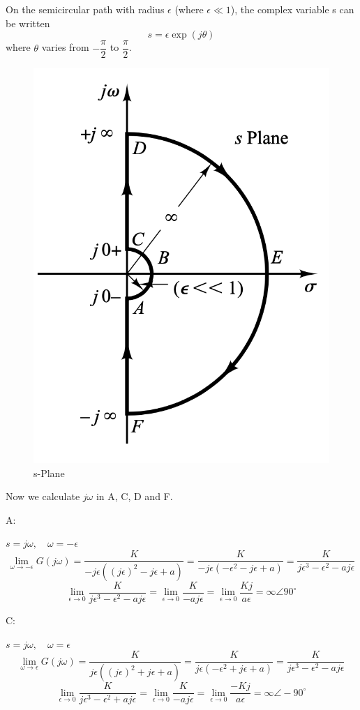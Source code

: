 On the semicircular path with radius $\epsilon$ (where $\epsilon \ll 1 $), the complex variable s can be written
$$
s = \epsilon \exp(j\theta)
$$
where $\theta$ varies from $-\dfrac{\pi}{2}$ to $\dfrac{\pi}{2}$.
\begin{figure}[H]
	\caption{s-Plane}
	\centering
	\includegraphics[width=12cm]{../Figure/Q2/nyquist_s_plane_name.png}
\end{figure}
Now we calculate $j\omega$ in A, C, D and F.

A:

$s = j\omega,\quad \omega = -\epsilon$
$$
 \lim_{\omega\to -\epsilon}G(j\omega)  = \dfrac{K}{-j\epsilon((j\epsilon)^2 - j\epsilon + a)} = \dfrac{K}{-j\epsilon(-\epsilon^2 - j\epsilon + a)} = \dfrac{K}{j\epsilon^3 - \epsilon^2 - aj\epsilon}
$$
$$
\lim_{\epsilon \to 0}\dfrac{K}{j\epsilon^3 - \epsilon^2 - aj\epsilon} = \lim_{\epsilon \to 0} \dfrac{K}{-aj\epsilon} = \lim_{\epsilon \to 0} \dfrac{Kj}{a\epsilon} =  \infty \angle 90^{\circ}
$$

C:

$s = j\omega,\quad \omega = \epsilon$
$$
 \lim_{\omega\to \epsilon}G(j\omega)  = \dfrac{K}{j\epsilon((j\epsilon)^2 + j\epsilon + a)} = \dfrac{K}{j\epsilon(-\epsilon^2 + j\epsilon + a)} = \dfrac{K}{j\epsilon^3 - \epsilon^2 - aj\epsilon}
$$
$$
\lim_{\epsilon \to 0}\dfrac{K}{j\epsilon^3 - \epsilon^2 + aj\epsilon} = \lim_{\epsilon \to 0} \dfrac{K}{-aj\epsilon} = \lim_{\epsilon \to 0} \dfrac{-Kj}{a\epsilon} =  \infty \angle -90^{\circ}
$$

